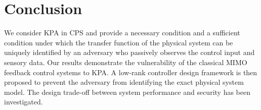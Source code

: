   \section{Conclusion}
  \label{sec:conclusion}
We consider KPA in CPS and provide a necessary condition and a sufficient condition under which the transfer function of the physical system can be uniquely identified by an adversary who passively observes the control input and sensory data. Our results demonstrate the vulnerability of the classical MIMO feedback control systems to KPA. A low-rank controller design framework is then proposed to prevent the adversary from identifying the exact physical system model. The design trade-off between system performance and security has been investigated.